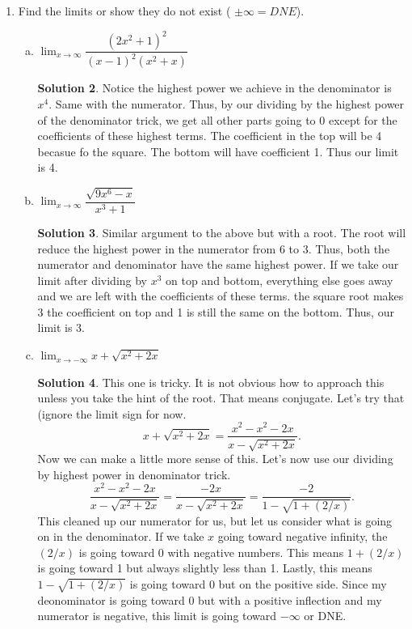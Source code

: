 \documentclass[10pt]{article}
\newcommand{\ds}{\displaystyle}
\theoremstyle{Theorem}
\theoremstyle{definition}
\newtheorem*{solution}{Solution}
\theoremstyle{remark}
\theoremstyle{custom}
\begin{document}
\begin{enumerate}[1.]
\begin{enumerate}[a.]
\begin{solution}
\end{solution}
\end{enumerate}
\item Find the limits or show they do not exist ( $\pm \infty=DNE$).
\begin{enumerate}[a.]
\item $\ds\lim_{x\rightarrow\infty}\dfrac{(2x^2+1)^2}{(x-1)^2(x^2+x)}$
\begin{solution}
Notice the highest power we achieve in the denominator is $x^4$. Same with the numerator. Thus, by our dividing by the highest power of the denominator trick, we get all other parts going to 0 except for the coefficients of these highest terms. The coefficient in the top will be 4 becasue fo the square. The bottom will have coefficient 1. Thus our limit is 4.
\end{solution}
\item $\ds\lim_{x\rightarrow\infty} \dfrac{\sqrt{9x^6-x}}{x^3+1}$
\begin{solution}
Similar argument to the above but with a root. The root will reduce the highest power in the numerator from 6 to 3. Thus, both the numerator and denominator have the same highest power. If we take our limit after dividing by $x^3$ on top and bottom, everything else goes away and we are left with the coefficients of these terms. the square root makes 3 the coefficient on top and 1 is still the same on the bottom. Thus, our limit is 3.
\end{solution}
\item $\ds\lim_{x\rightarrow -\infty} x+\sqrt{x^2+2x}$
\begin{solution}
This one is tricky. It is not obvious how to approach this unless you take the hint of the root. That means conjugate. Let's try that (ignore the limit sign for now.
\[
x+\sqrt{x^2+2x}=\dfrac{x^2-x^2-2x}{x-\sqrt{x^2+2x}}.
\]
Now we can make a little more sense of this. Let's now use our dividing by highest power in denominator trick.
\[
\dfrac{x^2-x^2-2x}{x-\sqrt{x^2+2x}}=
\dfrac{-2x}{x-\sqrt{x^2+2x}}=
\dfrac{-2}{1-\sqrt{1+(2/x)}}.
\]
This cleaned up our numerator for us, but let us consider what is going on in the denominator. If we take $x$ going toward negative infinity, the $(2/x)$ is going toward 0 with negative numbers. This means $1+(2/x)$ is going toward 1 but always slightly less than 1. Lastly, this means $1-\sqrt{1+(2/x)}$ is going toward 0 but on the positive side. Since my deonominator is going toward 0 but with a positive inflection and my numerator is negative, this limit is going toward $-\infty$ or DNE.

\end{solution}
\end{enumerate}
\end{enumerate}
\end{document}
